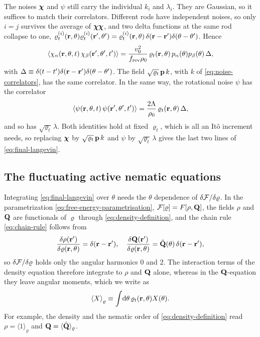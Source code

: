\documentclass[aps,pre,reprint,superscriptaddress,longbibliography,nofootinbib
]{revtex4-2}
\begin{document}
The noises $\boldsymbol\chi$ and $\psi$ still carry the individual
$k_i$ and $\lambda_i$. They are Gaussian, so it suffices to
match their correlators. Different rods have independent
noises, so only $i=j$ survives the average of
$\boldsymbol\chi\boldsymbol\chi$, and two delta functions at the same rod
collapse to one,
$\varrho^{(i)}_t(\mathbf{r},\theta)\varrho^{(i)}_t(\mathbf{r}',\theta')
=\varrho^{(i)}_t(\mathbf{r},
\theta)\,\delta(\mathbf{r}-\mathbf{r}')\delta(\theta-\theta')$. Hence
\begin{equation}
  \label{eq:dean-noise-sum}
  \left\langle\chi_\alpha(\mathbf{r},\theta,t)\,\chi_\beta(\mathbf{r}',\theta',t')\right\rangle
  = \frac{v_0^2}{f_{\rm rev}\rho_0}\,\varrho_t(\mathbf{r},\theta)\,p_\alpha(\theta)p_\beta(\theta)\,\Delta,
\end{equation}
with
$\Delta\equiv\delta(t-t')\delta(\mathbf{r}-\mathbf{r}')\delta(\theta-\theta')$.
The field $\sqrt{\varrho_t}\,\mathbf{p}\,k$, with $k$ of
\cref{eq:noise-correlators}, has the same correlator. In
the same way, the rotational noise $\psi$ has the
correlator
\begin{equation}
  \label{eq:dean-noise-sum-psi}
  \left\langle\psi(\mathbf{r},\theta,t)\,\psi(\mathbf{r}',\theta',t')\right\rangle
  = \frac{2\Lambda}{\rho_0}\,\varrho_t(\mathbf{r},\theta)\,\Delta,
\end{equation}
and so has $\sqrt{\varrho_t}\,\lambda$. Both identities
hold at fixed $\varrho_t$, which is all an It\^o increment
needs, so replacing $\boldsymbol\chi$ by $\sqrt{\varrho_t}\,\mathbf{p}\,k$
and $\psi$ by $\sqrt{\varrho_t}\,\lambda$ gives the last
two lines of \cref{eq:final-langevin}.

\subsection{The fluctuating active nematic equations}
\label{app:dean-angle}

Integrating \cref{eq:final-langevin} over $\theta$ needs
the $\theta$ dependence of $\delta\mathcal{F}/\delta\varrho$. In
the parametrization \cref{eq:free-energy-parametrisation},
$\mathcal{F}[\varrho]=F[\rho,\mathbf{Q}]$, the fields $\rho$ and $\mathbf{Q}$ are
functionals of $\varrho$ through
\cref{eq:density-definition}, and the chain rule
\cref{eq:chain-rule} follows from
\begin{align}
  \frac{\delta\rho(\mathbf{r}')}{\delta\varrho(\mathbf{r},\theta)}=\delta(\mathbf{r}-\mathbf{r}'),
  \quad
  \frac{\delta\mathbf{Q}(\mathbf{r}')}{\delta\varrho(\mathbf{r},\theta)}=\hat{\mathbf{Q}}(\theta)\,\delta(\mathbf{r}-\mathbf{r}'),
\end{align}
 so $\delta\mathcal{F}/\delta\varrho$ holds only the angular
 harmonics $0$ and $2$. The interaction terms of the
 density equation therefore integrate to $\rho$ and $\mathbf{Q}$
 alone, whereas in the $\mathbf{Q}$-equation they leave angular
 moments, which we write as
\begin{equation}\label{eq:average-def}
\left\langle X\right\rangle_\varrho\equiv\int\!\mathrm{d}\theta\,\varrho_t(\mathbf{r},\theta)X(\theta).
\end{equation}
For example, the density and the nematic order of
\cref{eq:density-definition} read
$\rho=\langle1\rangle_\varrho$ and
$\mathbf{Q}=\langle\hat{\mathbf{Q}}\rangle_\varrho$.
\end{document}
